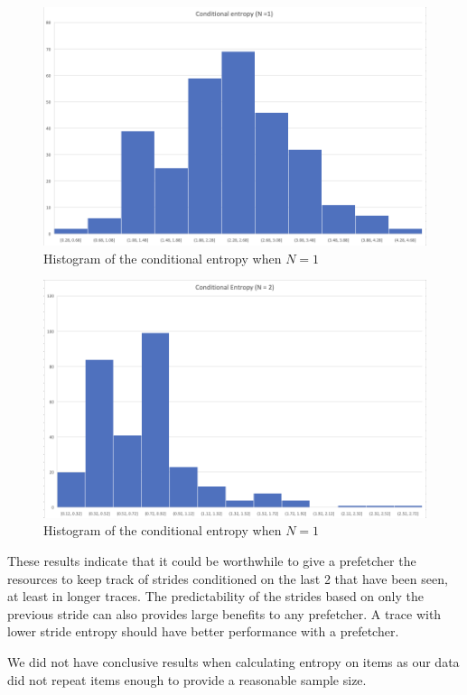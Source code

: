 \begin{figure}[ht]
    \centering
    \includegraphics[scale=0.7]{conditional 1.png}
    \caption{Histogram of the conditional entropy when $N = 1$}
    \label{fig:cond1}
\end{figure}

\begin{figure}[ht]
    \centering
    \includegraphics[scale=0.7]{conditional 2.png}
    \caption{Histogram of the conditional entropy when $N = 1$}
    \label{fig:cond2}
\end{figure}

These results indicate that it could be worthwhile to give a prefetcher the resources to keep track of strides conditioned on the last 2 that have been seen, at least in longer traces.  The predictability of the strides based on only the previous stride can also provides large benefits to any prefetcher.  A trace with lower stride entropy should have better performance with a prefetcher.

We did not have conclusive results when calculating entropy on items as our data did not repeat items enough to provide a reasonable sample size.
